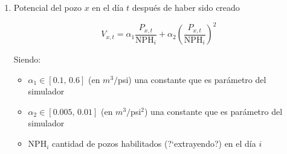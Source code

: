 \begin{enumerate}
 \item Potencial del pozo $x$ en el d\'ia $t$ despu\'es de haber sido creado
 
 \begin{equation*}
  V_{x,t} = \alpha_1 \frac{P_{x,t}}{\text{NPH}_i} + \alpha_2 \left(\frac{P_{x,t}}{\text{NPH}_i}\right)^2
 \end{equation*}

 Siendo: 
 
 \begin{itemize}
  \item $\alpha_1\in[\text{0.1, 0.6}]$ (en $m^3/$psi) una constante que es par\'ametro del simulador
  \item $\alpha_2\in[\text{0.005, 0.01}]$ (en $m^3/$psi$^2$) una constante que es par\'ametro del simulador
  \item NPH$_i$ cantidad de pozos habilitados (?`extrayendo?) en el d\'ia $i$
 \end{itemize}

\end{enumerate}
